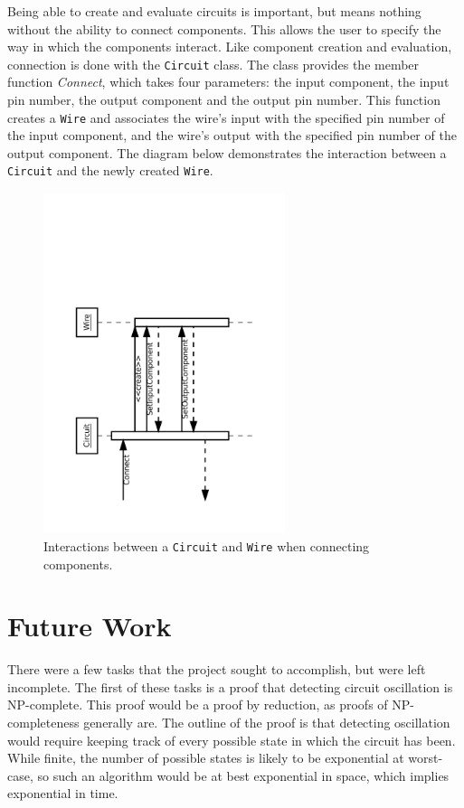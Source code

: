 \documentclass{article}
\newcommand{\ClassName}[1]{\texttt{#1}}
\newcommand{\FunctionName}[1]{\textit{#1}}
\begin{document}
Being able to create and evaluate circuits is important, but means nothing without the ability to connect components. This allows the user to specify the way in which the components interact. Like component creation and evaluation, connection is done with the \ClassName{Circuit} class. The class provides the member function \FunctionName{Connect}, which takes four parameters: the input component, the input pin number, the output component and the output pin number. This function creates a \ClassName{Wire} and associates the wire's input with the specified pin number of the input component, and the wire's output with the specified pin number of the output component. The diagram below demonstrates the interaction between a \ClassName{Circuit} and the newly created \ClassName{Wire}.

\begin{figure}[H]
    \begin{center}
        \includegraphics[angle=270,width=200pt]{imgs/ComponentConnectionInteraction.pdf}
    \end{center}
    \caption{Interactions between a \ClassName{Circuit} and \ClassName{Wire} when connecting components.}
\end{figure}

\section{Future Work}

There were a few tasks that the project sought to accomplish, but were left incomplete. The first of these tasks is a proof that detecting circuit oscillation is NP-complete. This proof would be a proof by reduction, as proofs of NP-completeness generally are. The outline of the proof is that detecting oscillation would require keeping track of every possible state in which the circuit has been. While finite, the number of possible states is likely to be exponential at worst-case, so such an algorithm would be at best exponential in space, which implies exponential in time.
\end{document}
